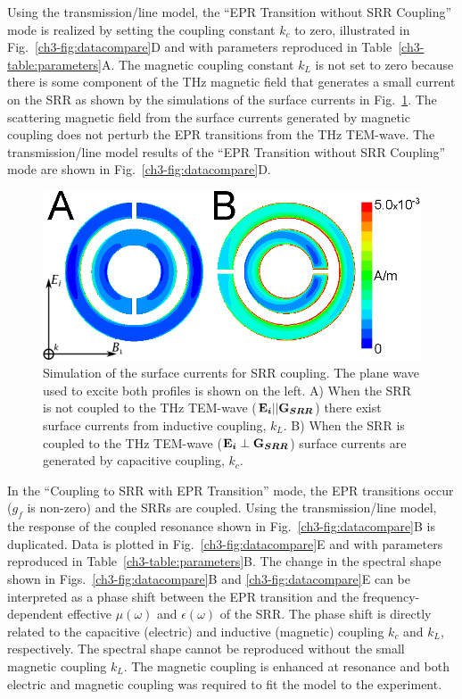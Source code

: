 Using the transmission\-/line model, the ``EPR Transition without SRR Coupling'' mode is realized by setting the coupling constant $k_c$ to zero, illustrated in Fig.~\ref{ch3-fig:datacompare}D and with parameters reproduced in Table~\ref{ch3-table:parameters}A. The magnetic coupling constant $k_L$ is not set to zero because there is some component of the THz magnetic field that generates a small current on the SRR as shown by the simulations of the surface currents in Fig.~\ref{ch3-fig:surfacecurrent}. The scattering magnetic field from the surface currents generated by magnetic coupling does not perturb the EPR transitions from the THz TEM-wave. The transmission\-/line model results of the ``EPR Transition without SRR Coupling'' mode are shown in Fig.~\ref{ch3-fig:datacompare}D.

\begin{figure}[htbp]\centering
  \includegraphics{Kapitel/Ch3-Images/SurfaceCurrent-THz.eps}%
  \caption[Simulation of the surface currents for SRR coupling.]{Simulation of the surface currents for SRR coupling. The plane wave used to excite both profiles is shown on the left. A) When the SRR is not coupled to the THz TEM-wave ($\textbf{E}\boldsymbol{_{i}}||\textbf{G}\boldsymbol{_{SRR}}$) there exist surface currents from inductive coupling, $k_L$. B) When the SRR is coupled to the THz TEM-wave ($\textbf{E}\boldsymbol{_{i}}\perp\textbf{G}\boldsymbol{_{SRR}}$) surface currents are generated by capacitive coupling, $k_c$.} \label{ch3-fig:surfacecurrent}
\end{figure}


In the ``Coupling to SRR with EPR Transition'' mode, the EPR transitions occur ($g_f$ is non-zero) and the SRRs are coupled. Using the transmission\-/line model, the response of the coupled resonance shown in Fig.~\ref{ch3-fig:datacompare}B is duplicated. Data is plotted in Fig.~\ref{ch3-fig:datacompare}E and with parameters reproduced in Table~\ref{ch3-table:parameters}B. The change in the spectral shape shown in Figs.~\ref{ch3-fig:datacompare}B and \ref{ch3-fig:datacompare}E can be interpreted as a phase shift between the EPR transition and the frequency-dependent effective $\mu(\omega)$ and $\epsilon(\omega)$ of the SRR. The phase shift is directly related to the capacitive (electric) and inductive (magnetic) coupling $k_c$ and $k_L$, respectively. The spectral shape cannot be reproduced without the small magnetic coupling $k_L$. The magnetic coupling is enhanced at resonance and both electric and magnetic coupling was required to fit the model to the experiment.

